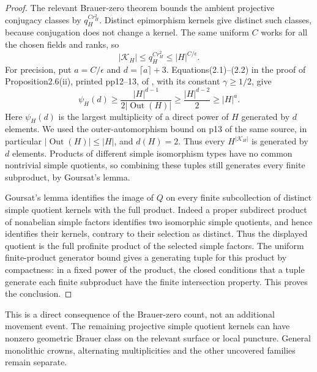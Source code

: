 \begin{proof}
The relevant Brauer-zero theorem bounds the ambient projective
conjugacy classes by $q_H^{Cr_H^2}$. Distinct epimorphism kernels
give distinct such classes, because conjugation does not change
a kernel. The same uniform $C$ works for all the chosen fields
and ranks, so
\[
             |\mathcal K_H|\le q_H^{Cr_H^2}
                                  \le |H|^{C/\epsilon}.
\]
For precision, put $a=C/\epsilon$ and
$d=\lceil a\rceil+3$. Equations(2.1)--(2.2) in the proof of
Proposition2.6(ii), printed pp12--13, of
\citet{LucchiniMarionTracey2020D}, with its constant
$\gamma\ge1/2$, give
\[
 \psi_H(d)\ge\frac{|H|^{d-1}}{2|\operatorname{Out}(H)|}
              \ge\frac{|H|^{d-2}}2\ge |H|^a.
\]
Here $\psi_H(d)$ is the largest multiplicity of a direct power
of $H$ generated by $d$ elements. We used the outer-automorphism
bound on p13 of the same source, in particular
$|\operatorname{Out}(H)|\le |H|$, and $d(H)=2$.
Thus every $H^{|\mathcal K_H|}$ is generated by $d$ elements.
Products of different simple isomorphism types have no common
nontrivial simple quotients, so combining these tuples still
generates every finite subproduct, by Goursat's lemma.

Goursat's lemma identifies the image of $Q$ on every finite
subcollection of distinct simple quotient kernels with the full
product. Indeed a proper subdirect product of nonabelian simple
factors identifies two isomorphic simple quotients, and hence
identifies their kernels, contrary to their selection as distinct.
Thus the displayed quotient is the full profinite product of
the selected simple factors. The uniform finite-product generator
bound gives a generating tuple for this product by compactness:
in a fixed power of the product, the closed conditions that a
tuple generate each finite subproduct have the finite intersection
property. This proves the conclusion.
\end{proof}

\begin{remark}
This is a direct consequence of the Brauer-zero count, not an
additional movement event. The remaining projective simple
quotient kernels can have nonzero geometric Brauer class on the
relevant surface or local puncture. General monolithic crowns,
alternating multiplicities and the other uncovered families
remain separate.
\end{remark}
